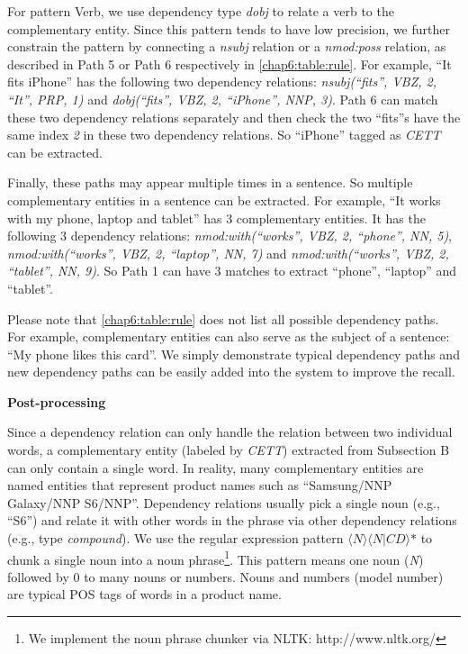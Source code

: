 For pattern Verb, we use dependency type \textit{dobj} to relate a verb to the complementary entity. Since this pattern tends to have low precision, we further constrain the pattern by connecting a \textit{nsubj} relation or a \textit{nmod:poss} relation, as described in Path 5 or Path 6 respectively in \ref{chap6:table:rule}. For example, ``It fits iPhone'' has the following two dependency relations: \textit{nsubj(``fits'', VBZ, 2, ``It'', PRP, 1)} and \textit{dobj(``fits'', VBZ, 2, ``iPhone'', NNP, 3)}. Path 6 can match these two dependency relations separately and then check the two ``fits''s have the same index \textit{2} in these two dependency relations. So ``iPhone'' tagged as \textit{CETT} can be extracted. 

Finally, these paths may appear multiple times in a sentence. So multiple complementary entities in a sentence can be extracted. For example, ``It works with my phone, laptop and tablet'' has 3 complementary entities. It has the following 3 dependency relations: \textit{nmod:with(``works'', VBZ, 2, ``phone'', NN, 5)}, \textit{nmod:with(``works'', VBZ, 2, ``laptop'', NN, 7)} and \textit{nmod:with(``works'', VBZ, 2, ``tablet'', NN, 9)}. So Path 1 can have 3 matches to extract ``phone'', ``laptop'' and ``tablet''.

Please note that \ref{chap6:table:rule} does not list all possible dependency paths. For example, complementary entities can also serve as the subject of a sentence: ``My phone likes this card''. We simply demonstrate typical dependency paths and new dependency paths can be easily added into the system to improve the recall.

\textbf{Post-processing}

Since a dependency relation can only handle the relation between two individual words, a complementary entity (labeled by \textit{CETT}) extracted from Subsection B can only contain a single word. In reality, many complementary entities are named entities that represent product names such as ``Samsung/NNP Galaxy/NNP S6/NNP''. Dependency relations usually pick a single noun (e.g., ``S6'') and relate it with other words in the phrase via other dependency relations (e.g., type \textit{compound}). We use the regular expression pattern $\langle \textit{N} \rangle \langle \textit{N}\vert \textit{CD} \rangle \textit{*}$ to chunk a single noun into a noun phrase\footnote{We implement the noun phrase chunker via NLTK: http://www.nltk.org/}. This pattern means one noun (\textit{N}) followed by 0 to many nouns or numbers. Nouns and numbers (model number) are typical POS tags of words in a product name.

